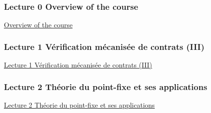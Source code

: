 \documentclass[ 12pt]{article}
\begin{document}
\subsubsection{Lecture 0  {Overview of the course }}
  
  \href{http://mery54.github.io/teaching/movex/lecturesnotes/malglecture0.pdf}{Overview of the course }


   \subsubsection{Lecture 1 {Vérification  mécanisée de contrats} (III)}

   \href{http://mery54.github.io/teaching/movex/lecturesnotes/malglecture1.pdf}{Lecture
     1  Vérification  mécanisée de contrats (III)}


  
   \subsubsection{Lecture 2 {Théorie du point-fixe et ses applications}}

   \href{http://mery54.github.io/teaching/movex/lecturesnotes/malglecture2.pdf}{Lecture
     2  Théorie du point-fixe et ses applications}


  



 

\end{document}
